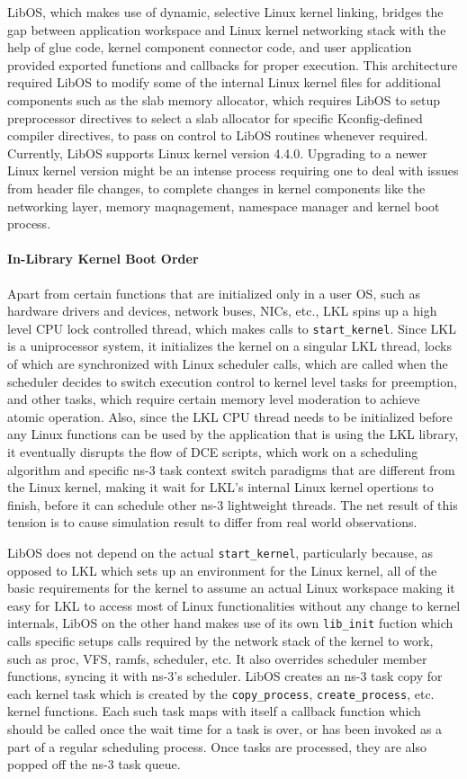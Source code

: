 \documentclass{sig-alternate}
\begin{document}
LibOS, which makes use of dynamic, selective Linux kernel linking, bridges the gap between application workspace and Linux kernel networking stack with
the help of glue code, kernel component connector code, and user application provided exported functions and callbacks for proper execution. This
architecture required LibOS to modify some of the internal Linux kernel files for additional components such as the slab memory allocator, which requires 
LibOS to setup preprocessor directives to select a slab allocator for specific Kconfig-defined compiler directives, to pass on control to LibOS routines 
whenever required. Currently, LibOS supports Linux kernel version 4.4.0. Upgrading to a newer Linux kernel version might be an intense process requiring one 
to deal with issues from header file changes, to complete changes in kernel components like the networking layer, memory maqnagement, namespace manager 
and kernel boot process.


\paragraph{In-Library Kernel Boot Order}
Apart from certain functions that are initialized only in a user OS, such as hardware drivers and devices, network buses, NICs, etc., LKL spins up a high level CPU lock controlled thread, which makes calls to 
\texttt{start\_kernel}. Since LKL is a uniprocessor system, it initializes the kernel on a singular LKL thread, locks of 
which are synchronized with Linux scheduler calls, which are called when the scheduler decides to switch execution control 
to kernel level tasks for preemption, and other tasks, which require certain memory level moderation to achieve
atomic operation. Also, since the LKL CPU thread needs to be initialized before any Linux functions can be used by the 
application that is using the LKL library, it eventually disrupts the flow of DCE scripts, which work on a 
scheduling algorithm and specific ns-3 task context switch paradigms that are different from the Linux kernel,
making it wait for LKL's internal Linux kernel opertions to finish, before it can schedule other ns-3 lightweight
threads.  The net result of this tension is to cause simulation result to differ from real world observations.

LibOS does not depend on the actual \texttt{start\_kernel}, particularly because, as opposed to LKL which sets up an environment 
for the Linux kernel, all of the basic requirements for the kernel to assume an actual Linux workspace making it easy 
for LKL to access most of Linux functionalities without any change to kernel internals, LibOS on the other hand makes 
use of its own \texttt{lib\_init} fuction which calls specific setups calls required by the network stack of the kernel to 
work, such as proc, VFS, ramfs, scheduler, etc. It also overrides scheduler member functions, syncing it with ns-3's 
scheduler. LibOS creates an ns-3 task copy for each kernel task which is created by the \texttt{copy\_process}, \texttt{create\_process},
etc. kernel functions. Each such task maps with itself a callback function which should be called once the wait time
for a task is over, or has been invoked as a part of a regular scheduling process. Once tasks are processed, they are 
also popped off the ns-3 task queue.
\end{document}
